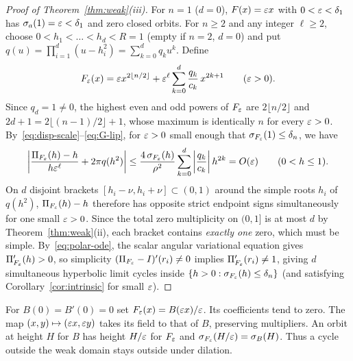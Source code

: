 \begin{proof}[Proof of Theorem~\ref{thm:weak}\textup{(iii)}]
For $n=1$ ($d=0$), $F(x)=\varepsilon x$ with $0<\varepsilon<\delta_1$ has $\sigma_a(1)=\varepsilon<\delta_1$ and zero closed orbits. For $n\ge 2$ and any integer $\ell\ge 2$, choose $0<h_1<\dots<h_d<R=1$ (empty if $n=2$, $d=0$) and put $q(u)=\prod_{i=1}^d(u-h_i^2)=\sum_{k=0}^d q_k u^k$. Define
\begin{equation}\label{eq:weak-realize}
  F_\varepsilon(x) = \varepsilon x^{2\lfloor n/2\rfloor} + \varepsilon^\ell\sum_{k=0}^d \frac{q_k}{c_k}\,x^{2k+1}\qquad (\varepsilon>0).
\end{equation}
Since $q_d=1\neq 0$, the highest even and odd powers of $F_\varepsilon$ are $2\lfloor n/2\rfloor$ and $2d+1=2\lfloor(n-1)/2\rfloor+1$, whose maximum is identically $n$ for every $\varepsilon>0$. By~\eqref{eq:disp-scale}--\eqref{eq:G-lip}, for $\varepsilon>0$ small enough that $\sigma_{F_\varepsilon}(1)\le\delta_n$, we have
\begin{equation}\label{eq:weak-cauchy-err}
  \left|\frac{\Pi_{F_\varepsilon}(h)-h}{h\varepsilon^\ell} + 2\pi q(h^2)\right| \le \frac{4\,\sigma_{F_\varepsilon}(h)}{\rho^2}\sum_{k=0}^d\left|\frac{q_k}{c_k}\right|h^{2k} = O(\varepsilon)\qquad (0<h\le 1).
\end{equation}
On $d$ disjoint brackets $[h_i-\nu,h_i+\nu]\subset(0,1)$ around the simple roots $h_i$ of $q(h^2)$, $\Pi_{F_\varepsilon}(h)-h$ therefore has opposite strict endpoint signs simultaneously for one small $\varepsilon>0$. Since the total zero multiplicity on $(0,1]$ is at most $d$ by Theorem~\ref{thm:weak}(ii), each bracket contains \emph{exactly one} zero, which must be simple. By~\eqref{eq:polar-ode}, the scalar angular variational equation gives $\Pi_{F_\varepsilon}'(h)>0$, so simplicity $(\Pi_{F_\varepsilon}-I)'(r_i)\neq 0$ implies $\Pi_{F_\varepsilon}'(r_i)\neq 1$, giving $d$ simultaneous hyperbolic limit cycles inside $\{h>0:\sigma_{F_\varepsilon}(h)\le\delta_n\}$ (and satisfying Corollary~\ref{cor:intrinsic} for small $\varepsilon$).
\end{proof}

\begin{remark}[Dilation]
For $B(0)=B'(0)=0$ set $F_\varepsilon(x)=B(\varepsilon x)/\varepsilon$.
Its coefficients tend to zero. The map $(x,y)\mapsto(\varepsilon x,\varepsilon y)$
takes its field to that of $B$, preserving multipliers. An orbit at height
$H$ for $B$ has height $H/\varepsilon$ for $F_\varepsilon$ and
$\sigma_{F_\varepsilon}(H/\varepsilon)=\sigma_B(H)$. Thus a cycle outside the weak
domain stays outside under dilation.
\end{remark}
